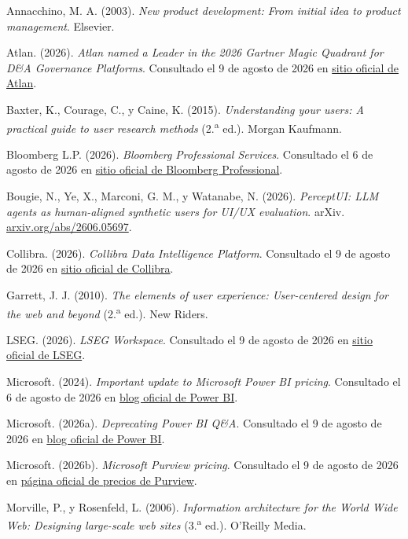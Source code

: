 \begin{uxreferencias}
Annacchino, M. A. (2003). \textit{New product development: From initial idea to product
management}. Elsevier.

Atlan. (2026). \textit{Atlan named a Leader in the 2026 Gartner Magic Quadrant for D\&A Governance Platforms}. Consultado el 9 de agosto de 2026 en \href{https://atlan.com/}{sitio oficial de Atlan}.

Baxter, K., Courage, C., y Caine, K. (2015). \textit{Understanding your users: A practical
guide to user research methods} (2.\textsuperscript{a} ed.). Morgan Kaufmann.

Bloomberg L.P. (2026). \textit{Bloomberg Professional Services}. Consultado el 6 de agosto de 2026 en \href{https://www.bloomberg.com/professional/}{sitio oficial de Bloomberg Professional}.

Bougie, N., Ye, X., Marconi, G. M., y Watanabe, N. (2026). \textit{PerceptUI: LLM agents as
human-aligned synthetic users for UI/UX evaluation}. arXiv. \href{https://arxiv.org/abs/2606.05697}{arxiv.org/abs/2606.05697}.

Collibra. (2026). \textit{Collibra Data Intelligence Platform}. Consultado el 9 de agosto de 2026 en \href{https://www.collibra.com/}{sitio oficial de Collibra}.

Garrett, J. J. (2010). \textit{The elements of user experience: User-centered design for the
web and beyond} (2.\textsuperscript{a} ed.). New Riders.

LSEG. (2026). \textit{LSEG Workspace}. Consultado el 9 de agosto de 2026 en \href{https://www.lseg.com/}{sitio oficial de LSEG}.

Microsoft. (2024). \textit{Important update to Microsoft Power BI pricing}. Consultado el 6 de agosto de 2026 en \href{https://powerbi.microsoft.com/blog/important-update-to-microsoft-power-bi-pricing/}{blog oficial de Power BI}.

Microsoft. (2026a). \textit{Deprecating Power BI Q\&A}. Consultado el 9 de agosto de 2026 en \href{https://powerbi.microsoft.com/en-us/blog/deprecating-power-bi-qa/}{blog oficial de Power BI}.

Microsoft. (2026b). \textit{Microsoft Purview pricing}. Consultado el 9 de agosto de 2026 en \href{https://azure.microsoft.com/en-us/pricing/details/purview/}{página oficial de precios de Purview}.

Morville, P., y Rosenfeld, L. (2006). \textit{Information architecture for the World Wide Web:
Designing large-scale web sites} (3.\textsuperscript{a} ed.). O'Reilly Media.


\end{uxreferencias}
